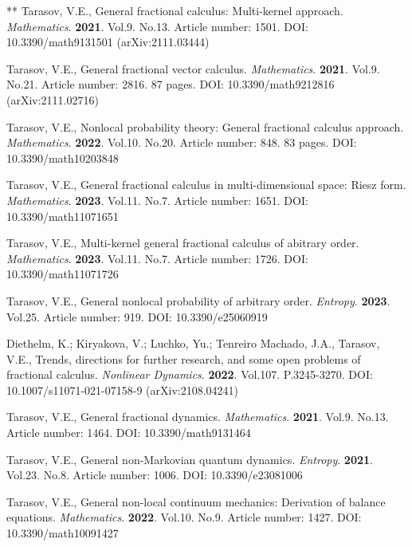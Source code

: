 \documentclass[12pt]{article}
\begin{document}
\begin{thebibliography}{**}
 Tarasov, V.E., 
General fractional calculus: Multi-kernel approach.
\textit{Mathematics}. 
\textbf{2021}. Vol.9. No.13. Article number: 1501.
DOI: 10.3390/math9131501 (arXiv:2111.03444)

 Tarasov, V.E.,
General fractional vector calculus.
\textit{Mathematics}. 
\textbf{2021}. Vol.9. No.21. Article number: 2816.
87 pages. DOI: 10.3390/math9212816 (arXiv:2111.02716)

 Tarasov, V.E.,
Nonlocal probability theory: General fractional calculus approach. 
\textit{Mathematics}. 
\textbf{2022}. Vol.10. No.20. Article number: 848. 83 pages.
DOI: 10.3390/math10203848

 Tarasov, V.E.,
General fractional calculus in multi-dimensional space: Riesz form. 
\textit{Mathematics}. 
\textbf{2023}. Vol.11. No.7. Article number: 1651. 
DOI: 10.3390/math11071651

 Tarasov, V.E.,
Multi-kernel general fractional calculus of 
abitrary order. 
\textit{Mathematics}. 
\textbf{2023}. Vol.11. No.7. Article number: 1726. 
DOI: 10.3390/math11071726

 Tarasov, V.E., 
General nonlocal probability of arbitrary order. 
\textit{Entropy}. \textbf{2023}. Vol.25. Article number: 919. 
DOI: 10.3390/e25060919

 Diethelm, K.; Kiryakova, V.; Luchko, Yu.; Tenreiro Machado, J.A., Tarasov, V.E.,
Trends, directions for further research, and some open problems of fractional calculus. 
\textit{Nonlinear Dynamics}. 
\textbf{2022}. Vol.107. P.3245-3270.
DOI: 10.1007/s11071-021-07158-9 
(arXiv:2108.04241)


 Tarasov, V.E., 
General fractional dynamics.
\textit{Mathematics}. 
\textbf{2021}. Vol.9. No.13. Article number: 1464.
DOI: 10.3390/math9131464

 Tarasov, V.E., 
General non-Markovian quantum dynamics.
\textit{Entropy}. 
\textbf{2021}. Vol.23. No.8. Article number: 1006.
DOI: 10.3390/e23081006

 Tarasov, V.E.,
General non-local continuum mechanics: Derivation of balance equations. 
\textit{Mathematics}. 
\textbf{2022}. Vol.10. No.9. Article number: 1427. 
DOI: 10.3390/math10091427 


\end{thebibliography}
\end{document}
